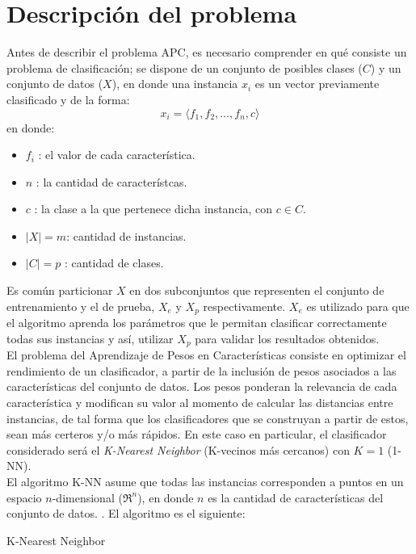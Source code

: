 \documentclass{ci5652}
\begin{document}
\section{Descripción del problema}

Antes de describir el problema APC, es necesario comprender en qué consiste
un problema de clasificación; se dispone de un conjunto de posibles clases
($C$) y un conjunto de datos ($X$), en donde una instancia $x_i$ es un vector
previamente clasificado y de la forma:
$$x_i = \langle f_1, f_2, \dots, f_n, c\rangle $$ en donde:

\begin{itemize}
  \item $f_i$ : el valor de cada característica.
  \item $n$ : la cantidad de característcas.
  \item $c$ : la clase a la que pertenece dicha instancia, con $c \in C$.
  \item $|X| = m$: cantidad de instancias.
  \item $|C| = p$ : cantidad de clases.
\end{itemize}

Es común particionar $X$ en dos subconjuntos que representen el conjunto de
entrenamiento y el de prueba, $X_e$ y $X_p$ respectivamente. $X_e$ es utilizado
para que el algoritmo aprenda los parámetros que le permitan clasificar
correctamente todas sus instancias y así, utilizar $X_p$ para validar los
resultados obtenidos.\\

El problema del Aprendizaje de Pesos en Características consiste en optimizar el
rendimiento de un clasificador, a partir de la inclusión de pesos asociados a
las características del conjunto de datos. Los pesos ponderan la relevancia de
cada característica y modifican su valor al momento de calcular las distancias
entre instancias, de tal forma que los clasificadores que se construyan a partir
de estos, sean más certeros y/o más rápidos. En este caso en particular, el
clasificador considerado será el \textit{K-Nearest Neighbor} (K-vecinos más
cercanos) con $K=1$ (1-NN).\\

El algoritmo K-NN asume que todas las instancias corresponden a puntos en un
espacio $n$-dimensional ($\Re^n$), en donde $n$ es la cantidad de
características del conjunto de datos. \cite{Mitchell_1997}. El algoritmo es el
siguiente:

\begin{algorithm}
 \DontPrintSemicolon
 \vspace*{0.1cm}
 \vspace*{0.1cm}
 \caption{K-Nearest Neighbor}
\end{algorithm}
\end{document}
